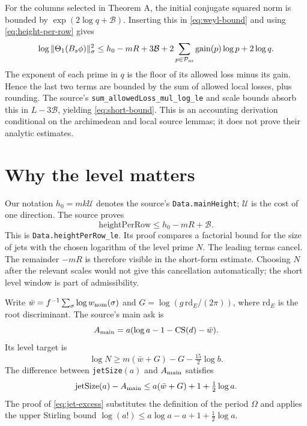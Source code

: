 \documentclass[11pt,oneside,openany]{amsbook}
\theoremstyle{remark}
\numberwithin{equation}{section}
\begin{document}
For the columns selected in Theorem A, the initial
conjugate squared norm is bounded by
$\exp(2\log q+\mathcal B)$. Inserting this in
\eqref{eq:weyl-bound} and using
\eqref{eq:height-per-row} gives
\[
\log\|\Theta_1(B_s\phi)\|_\sigma^2
\le h_0-mR+3\mathcal B
 +2\sum_{p\in\mathcal P_{\rm ns}}
      \mathrm{gain}(p)\log p+2\log q.
\]
The exponent of each prime in $q$ is the floor of its
allowed loss minus its gain. Hence the last two terms
are bounded by the sum of allowed local losses, plus
rounding. The source's
\texttt{sum\_allowedLoss\_mul\_log\_le} and scale bounds
absorb this in $L-3\mathcal B$, yielding
\eqref{eq:short-bound}. This is an accounting derivation
conditional on the archimedean and local source lemmas;
it does not prove their analytic estimates.

\section{Why the level matters}
Our notation $h_0=m k\mathcal U$ denotes the source's
\texttt{Data.mainHeight}; $\mathcal U$ is the cost of one
direction. The source proves
\begin{equation}
\label{eq:height-per-row}
\mathrm{heightPerRow}\le h_0-mR+\mathcal B.
\end{equation}
This is \texttt{Data.heightPerRow\_le}. Its proof compares a
factorial bound for the size of jets with the chosen logarithm
of the level prime $N$. The leading terms cancel. The
remainder $-mR$ is therefore visible in the short-form
estimate. Choosing $N$ after the relevant scales would not
give this cancellation automatically; the short level window
is part of admissibility.

Write $\bar w=f^{-1}\sum_\sigma\log w_{\rm nom}(\sigma)$
and $G=\log(g\,\mathrm{rd}_E/(2\pi))$, where
$\mathrm{rd}_E$ is the root discriminant. The source's
main ask is
\begin{equation}
\label{eq:main-ask}
A_{\rm main}=a(\log a-1-\operatorname{CS}(d)-\bar w).
\end{equation}
Its level target is
\begin{equation}
\label{eq:level-target}
\log N\ge m(\bar w+G)-G-\tfrac{15}{2}\log b.
\end{equation}
The difference between \texttt{jetSize}$(a)$ and
$A_{\rm main}$ satisfies
\begin{equation}
\label{eq:jet-excess}
\mathrm{jetSize}(a)-A_{\rm main}
\le a(\bar w+G)+1+\tfrac12\log a.
\end{equation}
The proof of \eqref{eq:jet-excess} substitutes the
definition of the period $\Omega$ and applies the
upper Stirling bound
$\log(a!)\le a\log a-a+1+\tfrac12\log a$.
\end{document}
